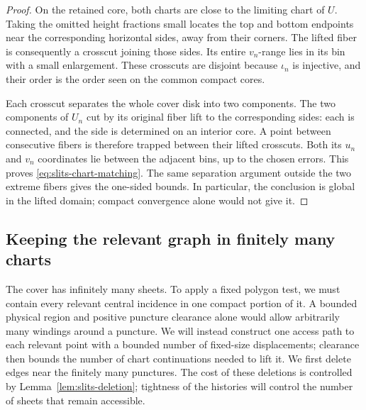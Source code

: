 \begin{proof}
On the retained core, both charts are close to the limiting chart
of $U$.  Taking the omitted height fractions small locates the top
and bottom endpoints near the corresponding horizontal sides,
away from their corners.  The lifted fiber is consequently a
crosscut joining those sides.  Its entire $v_n$-range lies in its
bin with a small enlargement.  These crosscuts are disjoint because
$\iota_n$ is injective, and their order is the order seen on the
common compact cores.

Each crosscut separates the whole cover disk into two components.
The two components of $U_n$ cut by its original fiber lift to the
corresponding sides: each is connected, and the side is determined
on an interior core.  A point between consecutive fibers is
therefore trapped between their lifted crosscuts.  Both its $u_n$
and $v_n$ coordinates lie between the adjacent bins, up to the
chosen errors.  This proves \eqref{eq:slits-chart-matching}.  The
same separation argument outside the two extreme fibers gives the
one-sided bounds.  In particular, the conclusion is global in the
lifted domain; compact convergence alone would not give it.
\end{proof}

\subsection{Keeping the relevant graph in finitely many charts}

The cover has infinitely many sheets.  To apply a fixed polygon test,
we must contain every relevant central incidence in one compact
portion of it.  A bounded physical region and positive puncture
clearance alone would allow arbitrarily many windings around a
puncture.  We will instead construct one access path to each relevant
point with a bounded number of fixed-size displacements; clearance
then bounds the number of chart continuations needed to lift it.
We first delete edges near the finitely many punctures.
The cost of these deletions is controlled by
Lemma~\ref{lem:slits-deletion}; tightness of the histories will control
the number of sheets that remain accessible.


